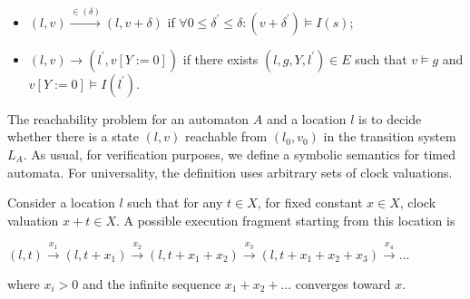 \begin{itemize}
\item
$(l,v) \xrightarrow{\in(\delta)} (l,v+\delta)$ if $\forall0 \leqslant \delta^{\prime} \leqslant \delta : (v + \delta^{\prime}) \models I(s)$;
\item
$(l,v) \rightarrow (l^{\prime},v[Y := 0])$ if there exists $(l,g,Y,l^{\prime}) \in E$ such that $v \models g$ and $v[Y := 0] \models I(l^{\prime})$.
\end{itemize}
The reachability problem for an automaton $A$ and a location $l$ is to decide whether there is a state $(l,v)$ reachable from $(l_{0},v_{0})$ in the transition system $L_{A}$. As usual, for verification purposes, we define a symbolic semantics for timed automata. For universality, the definition uses arbitrary sets of clock valuations.

Consider a location $l$ such that for any $t \in X$, for fixed constant $x \in X$, clock valuation $x + t \in X$. A possible execution fragment starting from this location is

$(l,t) \xrightarrow{x_{1}} (l,t+x_{1}) \xrightarrow{x_{2}} (l,t+x_{1}+x_{2}) \xrightarrow{x_{3}} (l,t+x_{1}+x_{2}+x_{3}) \xrightarrow{x_{4}}...$

where $x_{i} > 0$ and the infinite sequence $x_{1} + x_{2} + . . .$ converges toward $x$. 





